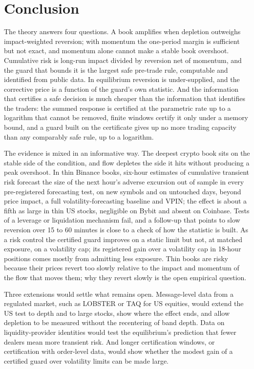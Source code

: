 \documentclass[12pt]{article}
\theoremstyle{definition}
\theoremstyle{remark}
\begin{document}
\section{Conclusion}\label{sec:conclusion}

The theory answers four questions. A book amplifies when depletion outweighs impact-weighted reversion; with momentum the one-period margin is sufficient but not exact, and momentum alone cannot make a stable book overshoot. Cumulative risk is long-run impact divided by reversion net of momentum, and the guard that bounds it is the largest safe pre-trade rule, computable and identified from public data. In equilibrium reversion is under-supplied, and the corrective price is a function of the guard's own statistic. And the information that certifies a safe decision is much cheaper than the information that identifies the traders: the summed response is certified at the parametric rate up to a logarithm that cannot be removed, finite windows certify it only under a memory bound, and a guard built on the certificate gives up no more trading capacity than any comparably safe rule, up to a logarithm.

The evidence is mixed in an informative way. The deepest crypto book sits on the stable side of the condition, and flow depletes the side it hits without producing a peak overshoot. In thin Binance books, six-hour estimates of cumulative transient risk forecast the size of the next hour's adverse excursion out of sample in every pre-registered forecasting test, on new symbols and on untouched days, beyond price impact, a full volatility-forecasting baseline and VPIN; the effect is about a fifth as large in thin US stocks, negligible on Bybit and absent on Coinbase. Tests of a leverage or liquidation mechanism fail, and a follow-up that points to slow reversion over 15 to 60 minutes is close to a check of how the statistic is built. As a risk control the certified guard improves on a static limit but not, at matched exposure, on a volatility cap; its registered gain over a volatility cap in 18-hour positions comes mostly from admitting less exposure. Thin books are risky because their prices revert too slowly relative to the impact and momentum of the flow that moves them; why they revert slowly is the open empirical question.

Three extensions would settle what remains open. Message-level data from a regulated market, such as LOBSTER or TAQ for US equities, would extend the US test to depth and to large stocks, show where the effect ends, and allow depletion to be measured without the recentering of band depth. Data on liquidity-provider identities would test the equilibrium's prediction that fewer dealers mean more transient risk. And longer certification windows, or certification with order-level data, would show whether the modest gain of a certified guard over volatility limits can be made large.
\end{document}
